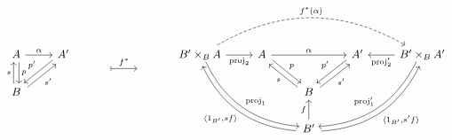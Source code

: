 \fontsize{11}{13}\selectfont
\[ 
\begin{tikzcd}
    A \arrow[r, "\alpha"] \arrow[d, "p", shift left]            & A' \arrow[ld, "p'"', shift right] & {} \arrow[r, "f^*", maps to, shift right=5] & {} & B'\times_BA \arrow[rrdd, "\mathrm{proj}_1", bend right, shift left] \arrow[r, "\mathrm{proj}_2"'] \arrow[rrrr, "f^*(\alpha)", dashed, bend left] & A \arrow[rd, "p", shift left] \arrow[rr, "\alpha"] &                                                                                                                                                            & A' \arrow[ld, "p'"', shift right] & B'\times_BA' \arrow[l, "\mathrm{proj}_2'"] \arrow[lldd, "\mathrm{proj}_1'"', bend left, shift right] \\
    B \arrow[u, "s", shift left] \arrow[ru, "s'"', shift right] &                                   &                                             &    &                                                                                                                                                  &                                                    & B \arrow[lu, "s", shift left] \arrow[ru, "s'"', shift right]                                                                                               &                                   &                                                                                                      \\
                                                                &                                   &                                             &    &                                                                                                                                                  &                                                    & B' \arrow[u, "f"] \arrow[lluu, "{\langle 1_{B'},sf\rangle}", bend left, shift left] \arrow[rruu, "{\langle 1_{B'},s'f \rangle}"', bend right, shift right] &                                   &                                                                                                     
    \end{tikzcd}
\]
